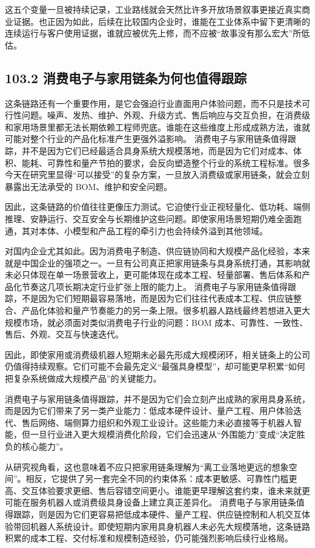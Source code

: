 这五个变量一旦被持续记录，工业路线就会天然比许多开放场景叙事更接近真实商业证据。也正因为如此，后续在比较国内企业时，谁能在工业体系中留下更清晰的连续运行与客户使用证据，谁就应被优先上修，而不应被“故事没有那么宏大”所低估。

\subsection*{103.2 消费电子与家用链条为何也值得跟踪}


这条链路还有一个重要作用，是它会强迫行业直面用户体验问题，而不只是技术可行性问题。噪声、发热、维护、外观、升级方式、售后响应与交互负担，在消费级和家用场景里都无法长期依赖工程师兜底。谁能在这些维度上形成成熟方法，谁就可能对整个行业的产品化标准产生更强外溢影响。 消费电子与家用链条值得跟踪，并不是因为它们已经最适合具身系统大规模落地，而是因为它们对成本、体积、能耗、可靠性和量产节拍的要求，会反向塑造整个行业的系统工程标准。很多今天在研究里显得“可以接受”的复杂方案，一旦放入消费级或家用链条，就会立刻暴露出无法承受的 BOM、维护和安全问题。

因此，这条链路的价值往往更像压力测试。它迫使行业正视轻量化、低功耗、端侧推理、安静运行、交互安全与长期维护这些问题。即使家用场景短期仍难全面跑通，其对本体、小模型和产品工程的牵引力也会持续外溢到其他领域。

对国内企业尤其如此。因为消费电子制造、供应链协同和大规模产品化经验，本来就是中国企业的强项之一。一旦有公司真正把家用链条与具身系统打通，其影响就未必只体现在单一场景营收上，更可能体现在成本工程、轻量部署、售后体系和产品化节奏这几项长期决定行业扩张上限的能力上。 消费电子与家用链条值得跟踪，不是因为它们短期最容易落地，而是因为它们往往代表成本工程、供应链整合、产品化体验和量产节奏能力的另一条上限。很多机器人路线最终若想进入更大规模市场，就必须面对类似消费电子行业的问题：BOM 成本、可靠性、一致性、售后、外观、交互与快速迭代。

因此，即使家用或消费级机器人短期未必最先形成大规模闭环，相关链条上的公司仍值得持续观察。它们可能不会最先定义“最强具身模型”，却可能更早积累“如何把复杂系统做成大规模产品”的关键能力。

消费电子与家用链条值得跟踪，并不是因为它们会立刻产出成熟的家用具身系统，而是因为它们带来了另一类产业能力：低成本硬件设计、量产工程、用户体验迭代、售后网络、端侧算力组织和外观工业设计。这些能力未必直接等于机器人智能，但一旦行业进入更大规模消费化阶段，它们会迅速从“外围能力”变成“决定胜负的核心能力”。

从研究视角看，这也意味着不应只把家用链条理解为“离工业落地更远的想象空间”。相反，它提供了另一套完全不同的约束体系：成本更敏感、可靠性门槛更高、交互体验要求更细、售后容错空间更小。谁能更早理解这套约束，谁未来就更可能在服务机器人或消费级具身设备上建立真正差异化。 消费电子与家用链条值得跟踪，则是因为它们更容易把低成本硬件、量产工程、供应链控制和人机交互体验带回机器人系统设计。即使短期内家用具身机器人未必先大规模落地，这条链路积累的成本工程、交付标准和规模制造经验，仍可能强烈影响后续行业格局。

